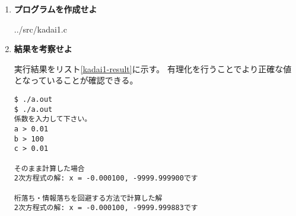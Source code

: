 \documentclass[titlepage]{jsarticle}
\begin{document}
\begin{enumerate}
\begin{itemize}
\begin{enumerate}
\end{enumerate}

\end{itemize}


\item \textbf{プログラムを作成せよ}


{../src/kadai1.c}


\item \textbf{結果を考察せよ}

実行結果をリスト\ref{kadai1-result}に示す。
有理化を行うことでより正確な値となっていることが確認できる。

\begin{lstlisting}[caption=実行結果,label=kadai1-result]
$ ./a.out
$ ./a.out
係数を入力して下さい。
a > 0.01
b > 100
c > 0.01

そのまま計算した場合
2次方程式の解: x = -0.000100, -9999.999900です

桁落ち・情報落ちを回避する方法で計算した解
2次方程式の解: x = -0.000100, -9999.999883です
\end{lstlisting}



\end{enumerate}
\end{document}
